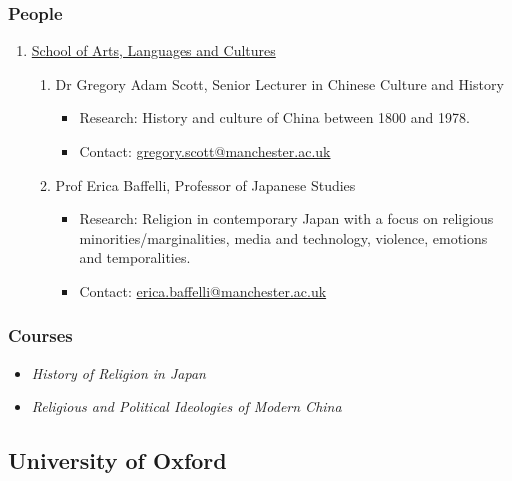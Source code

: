 \documentclass[a4paper,10.5pt]{article}
\begin{document}
\subsubsection{People}
\label{sec:org07baebc}
\begin{enumerate}
\item \href{https://www.research.manchester.ac.uk/portal/en/facultiesandschools/school-of-arts-languages-and-cultures(67be616e-b627-4747-a791-872e7594dfc1).html}{School of Arts, Languages and Cultures}
\label{sec:org0cfdf12}
\begin{enumerate}
\item Dr Gregory Adam Scott, Senior Lecturer in Chinese Culture and History
\label{sec:org19025ec}
\begin{itemize}
\item Research: History and culture of China between 1800 and 1978.\\
\item Contact: \href{mailto:gregory.scott@manchester.ac.uk}{gregory.scott@manchester.ac.uk}\\
\end{itemize}
\item Prof Erica Baffelli, Professor of Japanese Studies
\label{sec:org03aedff}
\begin{itemize}
\item Research: Religion in contemporary Japan with a focus on religious minorities/marginalities, media and technology, violence, emotions and temporalities.\\
\item Contact: \href{mailto:erica.baffelli@manchester.ac.uk}{erica.baffelli@manchester.ac.uk}\\
\end{itemize}
\end{enumerate}
\end{enumerate}
\subsubsection{Courses}
\label{sec:orgdd5042b}
\begin{itemize}
\item \emph{History of Religion in Japan}\\
\item \emph{Religious and Political Ideologies of Modern China}\\
\end{itemize}
\subsection{University of Oxford}
\label{sec:org1a9538f}
\end{document}
